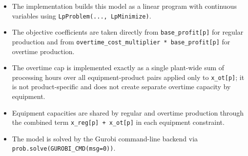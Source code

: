 \begin{itemize}
    \item The implementation builds this model as a linear program with continuous variables using \texttt{LpProblem(..., LpMinimize)}.
    \item The objective coefficients are taken directly from \texttt{base\_profit[p]} for regular production and from \texttt{overtime\_cost\_multiplier * base\_profit[p]} for overtime production.
    \item The overtime cap is implemented exactly as a single plant-wide sum of processing hours over all equipment-product pairs applied only to \texttt{x\_ot[p]}; it is not product-specific and does not create separate overtime capacity by equipment.
    \item Equipment capacities are shared by regular and overtime production through the combined term \texttt{x\_reg[p] + x\_ot[p]} in each equipment constraint.
    \item The model is solved by the Gurobi command-line backend via \texttt{prob.solve(GUROBI\_CMD(msg=0))}.
\end{itemize}
